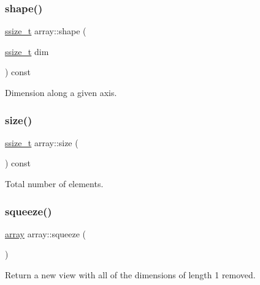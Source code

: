\subsubsection{\texorpdfstring{shape()}{shape()}\hspace{0.1cm}{\footnotesize\ttfamily [2/2]}}
{\footnotesize\ttfamily \mbox{\hyperlink{detail_2common_8h_ac430d16fc097b3bf0a7469cfd09decda}{ssize\+\_\+t}} array\+::shape (\begin{DoxyParamCaption}\item[{\mbox{\hyperlink{detail_2common_8h_ac430d16fc097b3bf0a7469cfd09decda}{ssize\+\_\+t}}}]{dim }\end{DoxyParamCaption}) const\hspace{0.3cm}{\ttfamily [inline]}}



Dimension along a given axis. 

\mbox{\label{classarray_a34ae467d17d30b99913e27c755403fef}} 
\subsubsection{\texorpdfstring{size()}{size()}}
{\footnotesize\ttfamily \mbox{\hyperlink{detail_2common_8h_ac430d16fc097b3bf0a7469cfd09decda}{ssize\+\_\+t}} array\+::size (\begin{DoxyParamCaption}{ }\end{DoxyParamCaption}) const\hspace{0.3cm}{\ttfamily [inline]}}



Total number of elements. 

\mbox{\label{classarray_af0e9b034604a5306671cdb114855a972}} 
\subsubsection{\texorpdfstring{squeeze()}{squeeze()}}
{\footnotesize\ttfamily \mbox{\hyperlink{classarray}{array}} array\+::squeeze (\begin{DoxyParamCaption}{ }\end{DoxyParamCaption})\hspace{0.3cm}{\ttfamily [inline]}}



Return a new view with all of the dimensions of length 1 removed. 

